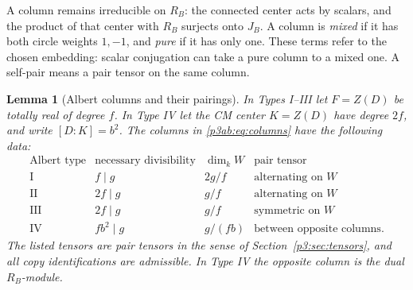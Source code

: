 \documentclass[11pt]{article}
\newtheorem{lemma}[theorem]{Lemma}
\numberwithin{equation}{section}
\begin{document}
A column remains irreducible on \(R_B\): the connected
center acts by scalars, and the product of that center with \(R_B\)
surjects onto \(J_B\).  A column is \emph{mixed} if it has both
circle weights \(1,-1\), and \emph{pure} if it has only one.
These terms refer to the chosen embedding: scalar conjugation can
take a pure column to a mixed one.
A self-pair means a pair tensor on the same column.

\begin{lemma}[Albert columns and their pairings]
\label{p3ab:albert-columns}
In Types I--III let \(F=Z(D)\) be totally real of degree \(f\).
In Type IV let the CM center \(K=Z(D)\) have degree \(2f\), and
write \([D:K]=b^2\).  The columns in
\eqref{p3ab:eq:columns} have the following data:
\[
\begin{array}{c|c|c|c}
 \text{Albert type}&\text{necessary divisibility}&\dim_k W&
       \text{pair tensor}\\ \hline
 \mathrm I& f\mid g&2g/f&\text{alternating on }W\\
 \mathrm{II}&2f\mid g&g/f&\text{alternating on }W\\
 \mathrm{III}&2f\mid g&g/f&\text{symmetric on }W\\
 \mathrm{IV}&fb^2\mid g&g/(fb)&\text{between opposite columns}.
\end{array}
\]
The listed tensors are pair tensors in the sense of
Section~\ref{p3:sec:tensors}, and all copy identifications are
admissible.  In Type IV the opposite column is the dual
\(R_B\)-module.
\end{lemma}
\end{document}
